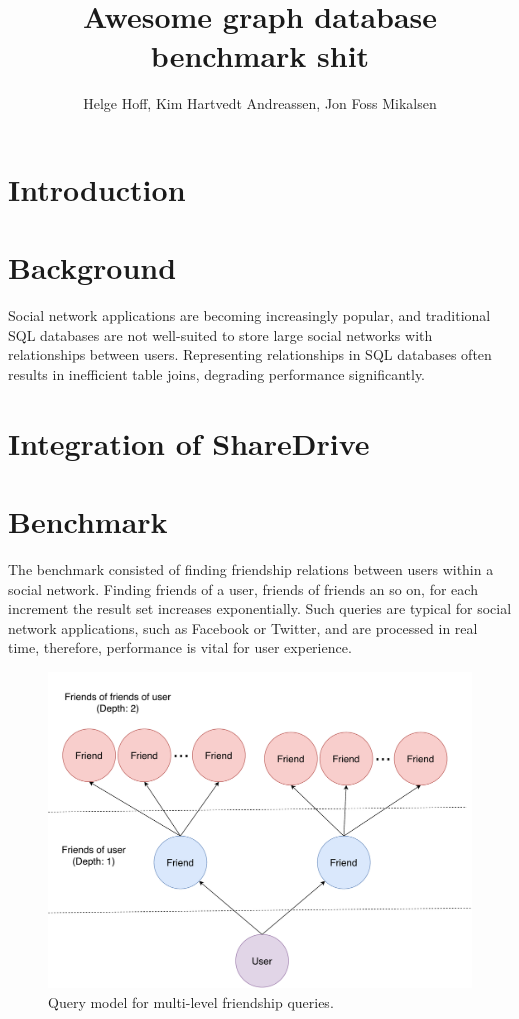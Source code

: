 \documentclass[a4paper, 12pt, conference]{IEEEtran}
\def \thetitle {Awesome graph database benchmark shit}
\def \theauthor {Helge Hoff, Kim Hartvedt Andreassen, Jon Foss Mikalsen}
\begin{document}
\title{\thetitle}
\author{\theauthor}

\maketitle
\thispagestyle{plain}

 
\IEEEpeerreviewmaketitle

\section{Introduction}

\section{Background}
Social network applications are becoming increasingly popular, and traditional SQL databases are not well-suited to store large social networks with relationships between users.
Representing relationships in SQL databases often results in inefficient table joins, degrading performance significantly.
 
  
\cite{neo_scale}
\section{Integration of ShareDrive}
\section{Benchmark}
The benchmark consisted of finding friendship relations between users within a social network.
Finding friends of a user, friends of friends an so on, for each increment the result set increases exponentially.
Such queries are typical for social network applications, such as Facebook or Twitter, and are processed in real time, therefore, performance is vital for user experience.
\begin{figure}[h]
	\centering
	\includegraphics[scale=0.3]{friends.pdf}
	\caption{Query model for multi-level friendship queries.}
\end{figure}
\end{document}
